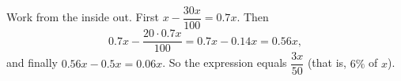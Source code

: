 Work from the inside out. First $x-\dfrac{30x}{100}=0.7x$. Then
\[
0.7x-\dfrac{20\cdot0.7x}{100}=0.7x-0.14x=0.56x ,
\]
and finally $0.56x-0.5x=0.06x$. So the expression equals $\boxed{\dfrac{3x}{50}}$ (that is, $6\%$ of $x$).
